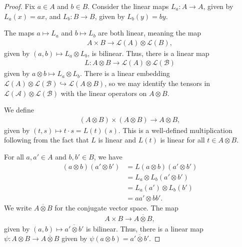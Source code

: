 \documentclass[10pt]{mypackage}
\begin{document}
\begin{proof}
  Fix $a\in A$ and $b\in B$. Consider the linear maps $L_a\colon A\rightarrow A$, given by $L_a\left(x\right) = ax$, and $L_b\colon B\rightarrow B$, given by $L_b\left(y\right) = by$.\newline

  The maps $a\mapsto L_a$ and $b\mapsto L_b$ are both linear, meaning the map
  \begin{align*}
    A\times B\rightarrow \mathcal{L}\left(A\right)\otimes \mathcal{L}\left(B\right),
  \end{align*}
  given by $\left(a,b\right) \mapsto L_a\otimes L_b$, is bilinear. Thus, there is a linear map
  \begin{align*}
    L\colon A\otimes B \rightarrow \mathcal{L}\left(A\right)\otimes \mathcal{L}\left(\mathcal{B}\right)
  \end{align*}
  given by $a\otimes b \mapsto L_a\otimes L_b$. There is a linear embedding $\mathcal{L}\left(A\right)\otimes \mathcal{L}\left(\mathcal{B}\right)\hookrightarrow \mathcal{L}\left(A\otimes B\right)$, so we may identify the tensors in $\mathcal{L}\left(\mathcal{A}\right)\otimes \mathcal{L}\left(\mathcal{B}\right)$ with the linear operators on $A\otimes B$.\newline

  We define
  \begin{align*}
    \left(A\otimes B\right)\times \left(A\otimes B\right)\rightarrow A\otimes B,
  \end{align*}
  given by $\left(t,s\right) \mapsto t\cdot s = L(t)(s)$. This is a well-defined multiplication following from the fact that $L$ is linear and $L(t)$ is linear for all $t\in A\otimes B$.\newline

  For all $a,a'\in A$ and $b,b'\in B$, we have
  \begin{align*}
    \left(a\otimes b\right)\left(a'\otimes b'\right) &= L\left(a\otimes b\right)\left(a'\otimes b'\right)\\
                                                     &= L_a\otimes L_b\left(a'\otimes b'\right)\\
                                                     &= L_a\left(a'\right)\otimes L_b\left(b'\right)\\
                                                     &= aa'\otimes bb'.
  \end{align*}
  We write $\overline{A\otimes B}$ for the conjugate vector space. The map
  \begin{align*}
    A\times B \rightarrow \overline{A\otimes B},
  \end{align*}
  given by $\left(a,b\right) \mapsto \overline{a'\otimes b'}$ is bilinear. Thus, there is a linear map $\psi\colon A\otimes B\rightarrow \overline{A\otimes B}$ given by $\psi\left(a\otimes b\right) = \overline{a'\otimes b'}$.\newline


\end{proof}
\end{document}
